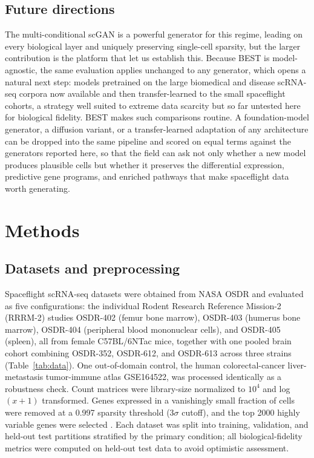 \documentclass[11pt]{article}
\newcommand{\fides}{BEST}
\begin{document}
\subsection{Future directions}
The multi-conditional scGAN is a powerful generator for this regime, leading on every biological layer and uniquely preserving single-cell sparsity, but the larger contribution is the platform that let us establish this. Because \fides{} is model-agnostic, the same evaluation applies unchanged to any generator, which opens a natural next step: models pretrained on the large biomedical and disease scRNA-seq corpora now available and then transfer-learned to the small spaceflight cohorts, a strategy well suited to extreme data scarcity but so far untested here for biological fidelity. \fides{} makes such comparisons routine. A foundation-model generator, a diffusion variant, or a transfer-learned adaptation of any architecture can be dropped into the same pipeline and scored on equal terms against the generators reported here, so that the field can ask not only whether a new model produces plausible cells but whether it preserves the differential expression, predictive gene programs, and enriched pathways that make spaceflight data worth generating.

\section{Methods}

\subsection{Datasets and preprocessing}
Spaceflight scRNA-seq datasets were obtained from NASA OSDR and evaluated as five configurations: the individual Rodent Research Reference Mission-2 (RRRM-2) studies OSDR-402 (femur bone marrow), OSDR-403 (humerus bone marrow), OSDR-404 (peripheral blood mononuclear cells), and OSDR-405 (spleen), all from female C57BL/6NTac mice, together with one pooled brain cohort combining OSDR-352, OSDR-612, and OSDR-613 across three strains (Table~\ref{tab:data}). One out-of-domain control, the human colorectal-cancer liver-metastasis tumor-immune atlas GSE164522, was processed identically as a robustness check. Count matrices were library-size normalized to $10^4$ and log$(x+1)$ transformed. Genes expressed in a vanishingly small fraction of cells were removed at a 0.997 sparsity threshold ($3\sigma$ cutoff), and the top 2000 highly variable genes were selected \cite{seurat}. Each dataset was split into training, validation, and held-out test partitions stratified by the primary condition; all biological-fidelity metrics were computed on held-out test data to avoid optimistic assessment.
\end{document}
